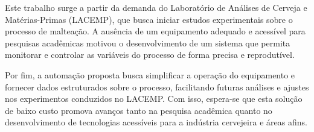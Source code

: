 Este trabalho surge a partir da demanda do Laboratório de Análises de Cerveja e Matérias-Primas (LACEMP), que busca iniciar estudos experimentais sobre o processo de malteação. A ausência de um equipamento adequado e acessível para pesquisas acadêmicas motivou o desenvolvimento de um sistema que permita monitorar e controlar as variáveis do processo de forma precisa e reprodutível. 

Por fim, a automação proposta busca simplificar a operação do equipamento e fornecer dados estruturados sobre o processo, facilitando futuras análises e ajustes nos experimentos conduzidos no LACEMP. Com isso, espera-se que esta solução de baixo custo promova avanços tanto na pesquisa acadêmica quanto no desenvolvimento de tecnologias acessíveis para a indústria cervejeira e áreas afins.